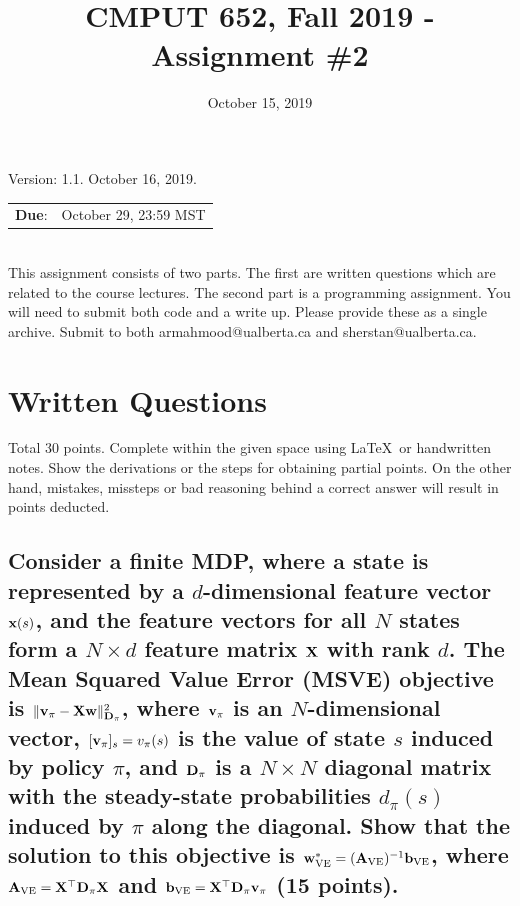 \documentclass{article}
\title{CMPUT 652, Fall 2019 - Assignment \#2}
\date{October 15, 2019}
\newcommand{\x}{{\bf x}}
\newcommand{\X}{{\bf X}}
\newcommand{\bv}{{\bf v}}
\newcommand{\w}{{\bf w}}
\newcommand{\D}{{\bf D}}
\newcommand{\A}{{\bf A}}
\newcommand{\bb}{{\bf b}}
\newcommand{\on}{\operatorname}
\begin{document}
\maketitle

\begin{center}
    Version: 1.1. October 16, 2019.
\end{center}

\begin{tabular}{c c}
     \textbf{Due}: & October 29, 23:59 MST \\
\end{tabular}\\

This assignment consists of two parts. The first are written questions which are related to the course lectures. The second part is a programming assignment. You will need to submit both code and a write up. Please provide these as a single archive. Submit to both armahmood@ualberta.ca and sherstan@ualberta.ca.

\newcommand{\imgheight}{2.0in}

\section{Written Questions}
Total 30 points. Complete  within the given space using \LaTeX ~or handwritten notes. Show the derivations or the steps for obtaining partial points. On the other hand, mistakes, missteps or bad reasoning behind a correct answer will result in points deducted.

\newpage

\subsection{\normalsize 
Consider a finite MDP, where a state is represented by a $d$-dimensional feature vector $\x(s)$, and the feature vectors for all $N$ states form a $N\times d$ feature matrix $\X$ with rank $d$. 
The Mean Squared Value Error (MSVE) objective is $\Vert \bv_\pi - \X\w \Vert^2_{\D_\pi}$, where $\bv_\pi$ is an $N$-dimensional vector, $[\bv_\pi]_s = v_\pi(s)$ is the value of state $s$ induced by policy $\pi$, and $\D_\pi$ is a $N\times N$ diagonal matrix with the steady-state probabilities $d_\pi(s)$ induced by $\pi$ along the diagonal. Show that the solution to this objective is $\w^*_{\on{VE}} = (\A_{\on{VE}})^{-1} \bb_{\on{VE}}$, where $\A_{\on{VE}} = \X^\top \D_\pi\X$ and $\bb_{\on{VE}} = \X^\top\D_\pi \bv_\pi$
 (15 points).
}
\end{document}
